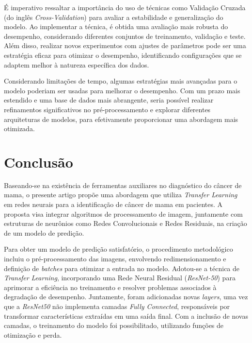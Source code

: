 É imperativo ressaltar a importância do uso de técnicas como Validação Cruzada (do inglês \textit{Cross-Validation}) para avaliar a estabilidade e generalização do modelo. Ao implementar a técnica, é obtida uma avaliação mais robusta do desempenho, considerando diferentes conjuntos de treinamento, validação e teste. Além disso, realizar novos experimentos com ajustes de parâmetros pode ser uma estratégia eficaz para otimizar o desempenho, identificando configurações que se adaptem melhor à natureza específica dos dados.

Considerando limitações de tempo, algumas estratégias mais avançadas para o modelo poderiam ser usadas para melhorar o desempenho. Com um prazo mais estendido e uma base de dados mais abrangente, seria possível realizar refinamentos significativos no pré-processamento e explorar diferentes arquiteturas de modelos, para efetivamente proporcionar uma abordagem mais otimizada.




\section{\esp Conclusão} \label{conclusion}
Baseando-se na existência de ferramentas auxiliares no diagnóstico do câncer de mama, o presente artigo propõe uma abordagem que utiliza \textit{Transfer Learning} em redes neurais para a identificação de câncer de mama em pacientes. A proposta visa integrar algoritmos de processamento de imagem, juntamente com estruturas de neurônios como Redes Convolucionais e Redes Residuais, na criação de um modelo de predição. 

Para obter um modelo de predição satisfatório, o procedimento metodológico incluiu o pré-processamento das imagens, envolvendo redimensionamento e definição de \textit{batches} para otimizar a entrada no modelo. Adotou-se a técnica de \textit{Transfer Learning}, incorporando uma Rede Neural Residual (\textit{ResNet-50}) para aprimorar a eficiência no treinamento e resolver problemas associados à degradação de desempenho. Juntamente, foram adicionadas novas \textit{layers}, uma vez que a \textit{ResNet50} não implementa camadas \textit{Fully Connected}, responsáveis por transformar características extraídas em uma saída final. Com a inclusão de novas camadas, o treinamento do modelo foi possibilitado, utilizando funções de otimização e perda.

